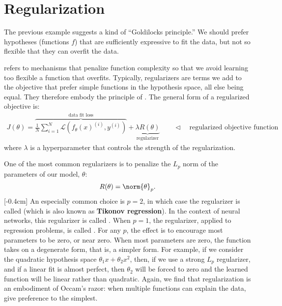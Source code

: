



\section{Regularization}

The previous example suggests a kind of ``Goldilocks principle.'' We should prefer hypotheses (functions $f$) that are sufficiently expressive to fit the data, but not so flexible that they can overfit the data. 


 refers to mechanisms that penalize function complexity so that we avoid learning too flexible a function that overfits. 
Typically, regularizers are terms we add to the objective that prefer simple functions in the hypothesis space, all else being equal. They therefore embody the principle of . The general form of a regularized objective is:
\begin{align}
    J(\theta) = \overbrace{\frac{1}{N} \sum^N_{i=1} \mathcal{L}(f_{\theta}(x)^{(i)}, y^{(i)})}^\text{data fit loss} + \underbrace{\lambda R(\theta)}_\text{regularizer} \quad\quad\triangleleft \quad\text{regularized objective function} \label{eqn:problem_of_generalization:regularized_objective}
\end{align}
where $\lambda$ is a hyperparameter that controls the strength of the regularization.

One of the most common regularizers is to penalize the $L_p$ norm of the parameters of our model, $\theta$:
\begin{equation}
    R(\theta) = \norm{\theta}_{p}.
\end{equation}
[-0.4cm]
An especially common choice is $p=2$, in which case the regularizer is called  (which is also known as {\bf Tikonov regression}). In the context of neural networks, this regularizer is called . When $p=1$, the regularizer, applied to regression problems, is called . For any $p$, the effect is to encourage most parameters to be zero, or near zero. When most parameters are zero, the function takes on a degenerate form, that is, a simpler form. For example, if we consider the quadratic hypothesis space $\theta_1 x + \theta_2 x^2$, then, if we use a strong $L_p$ regularizer, and if a linear fit is almost perfect, then $\theta_2$ will be forced to zero and the learned function will be linear rather than quadratic. Again, we find that regularization is an embodiment of Occam's razor: when multiple functions can explain the data, give preference to the simplest.

